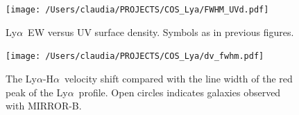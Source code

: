\documentclass[manuscript]{emulateapj}
\newcommand{\lya}{Ly$\alpha$}
\newcommand{\ha}{H$\alpha$}
\begin{document}
\begin{figure}[t!]
   \centering
   \texttt{[image: /Users/claudia/PROJECTS/COS\_Lya/FWHM\_UVd.pdf]}
   \caption{\lya\ EW versus UV surface density. Symbols as in
     previous figures.}
   \label{fig:lyauvsd}
\end{figure}

\begin{figure}[t!]
   \centering
   \texttt{[image: /Users/claudia/PROJECTS/COS\_Lya/dv\_fwhm.pdf]}
   \caption{The \lya-\ha\ velocity shift compared with the line width
     of the red peak of the \lya\ profile. Open circles indicates
     galaxies observed with MIRROR-B.}
   \label{fig:dvha}
\end{figure}





\end{document}

